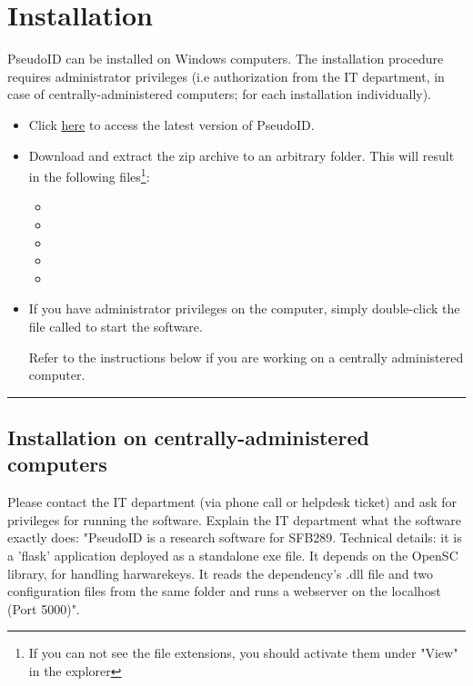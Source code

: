 \section{Installation}
PseudoID can be installed on Windows computers. The installation procedure requires administrator privileges (i.e authorization from the IT department, in case of centrally-administered computers; for each installation individually).

\begin{itemize}
    \item Click  \href{https://github.com/spisakt/PseudoID/releases}{\underline{here}} to access the latest version of PseudoID.
    \item Download and extract the zip archive to an arbitrary folder. This will result in the following files\footnote{If you can not see the file extensions, you should activate them under "View" in the explorer}: 
    \begin{itemize}
        \item {}
        \item {}
        \item {}
        \item {} 
        \item {}
    \end{itemize}
    \item If you have administrator privileges on the computer, simply double-click the file called  to start the software.
    
    Refer to the instructions below if you are working on a centrally administered computer.
\end{itemize} 
\par\noindent\rule{\textwidth\color{pniblue}}{0.4pt}

\subsection*{Installation on centrally-administered computers}

Please contact the IT department (via phone call or helpdesk ticket) and ask for privileges for running the software. Explain the IT department what the software exactly does: "PseudoID is a research software for SFB289. Technical details: it is a 'flask' application deployed as a standalone exe file. It depends on the OpenSC library, for handling harwarekeys.  It reads the dependency's .dll file and two configuration files from the same folder and runs a webserver on the localhost (Port 5000)".

